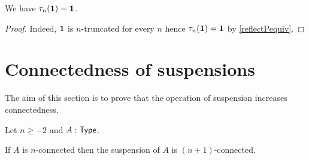 \begin{lem}
  We have $\tau_n(\mathbf{1})=\mathbf{1}$.
\end{lem}
\begin{proof}
  Indeed, $\mathbf{1}$ is $n$-truncated for every $n$ hence $\tau_n(\mathbf{1})=\mathbf{1}$ by
  \autoref{reflectPequiv}.
\end{proof}

\section{Connectedness of suspensions}

The aim of this section is to prove that the operation of suspension increases
connectedness.

\begin{thm}
  Let $n\ge-2$ and $A:\mathsf{Type}$.

  If $A$ is $n$-connected then the suspension of $A$ is $(n+1)$-connected.
\end{thm}

